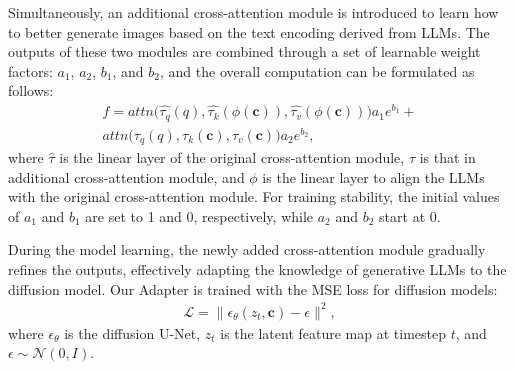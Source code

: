 Simultaneously, an additional cross-attention module is introduced to learn how to better generate images based on the text encoding derived from LLMs. The outputs of these two modules are combined through a set of learnable weight factors: $a_1$, $a_2$, $b_1$, and $b_2$, and the overall computation can be formulated as follows:
\begin{equation}
\begin{aligned}
f = attn\bigl(\hat{\tau_q}(q), \hat{\tau_k}(\phi(\bm c)), \hat{\tau_v}(\phi(\bm c))\bigr) a_1e^{b_1} + \\ attn\bigl(\tau_q(q), \tau_k(\bm c), \tau_v(\bm c)\bigr) a_2e^{b_2},
\end{aligned}
\end{equation}
where $\hat{\tau}$ is the linear layer of the original cross-attention module, $\tau$ is that in additional cross-attention module, and $\phi$ is the linear layer to align the LLMs with the original cross-attention module.
For training stability, the initial values of $a_1$ and $b_1$ are set to 1 and 0, respectively, while $a_2$ and $b_2$ start at 0. 

During the model learning, the newly added cross-attention module gradually refines the outputs, effectively adapting the knowledge of generative LLMs to the diffusion model.
Our Adapter is trained with the MSE loss for diffusion models:
\begin{equation}
\begin{aligned}
\mathcal{L} = \| \epsilon_{\theta}(z_t, \bm c) - \epsilon \|^2,
\end{aligned}
\end{equation}
where $\epsilon_{\theta}$ is the diffusion U-Net, $z_t$ is the latent feature map at timestep $t$, and $\epsilon \sim \mathcal{N}(0, I)$.

